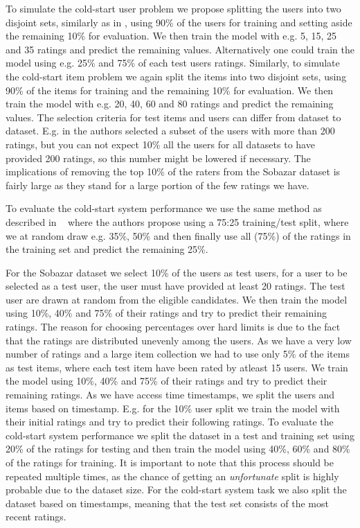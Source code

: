 To simulate the cold-start user problem we propose splitting the users into two disjoint
sets, similarly as in \cite{Stern2009, Lam2008}, using 90\% of the users for training and
setting aside the remaining 10\% for evaluation. We then train the model with e.g. 5, 15,
25 and 35 ratings and predict the remaining values. Alternatively one could train the model
using e.g. 25\% and 75\% of each test users ratings. Similarly, to simulate the cold-start
item problem we again split the items into two disjoint sets, using 90\% of the items
for training and the remaining 10\% for evaluation.  We then train the model with
e.g. 20, 40, 60 and 80 ratings and predict the remaining values. The selection criteria
for test items and users can differ from dataset to dataset. E.g. in \cite{Rashid2002, Rashid2008}
the authors selected a subset of the users with more than 200 ratings, but you can not
expect 10\% all the users for all datasets to have provided 200 ratings, so this number
might be lowered if necessary. The implications of removing the top 10\% of the
raters from the Sobazar dataset is fairly large as they stand for a large portion
of the few ratings we have.

To evaluate the cold-start system performance we use the same method as described
in ~\cite{Agarwal2009} where the authors propose using a 75:25 training/test split,
where we at random draw e.g. 35\%, 50\% and then finally use all (75\%) of the
ratings in the training set and predict the remaining 25\%.



For the Sobazar dataset we select 10\% of the users as test users, for a user to be
selected as a test user, the user must have provided at least 20 ratings. The test user are drawn
at random from the eligible candidates. We then train
the model using 10\%, 40\% and 75\% of their ratings and try to predict their remaining ratings.
The reason for choosing percentages over hard limits is due to the fact that the ratings are
distributed unevenly among the users. As we have a very low number of ratings and a large item collection we had to use
only 5\% of the items as test items, where each test item have been rated by atleast 15 users.
We train the model using 10\%, 40\% and 75\% of their ratings and try to predict their remaining
ratings. As we have access time timestamps, we split the users and items based on timestamp.
E.g. for the 10\% user split we train the model with their initial ratings and try to predict
their following ratings. To evaluate the cold-start system performance we split the dataset in a test
and training set using 20\% of the ratings for testing and then train the model
using 40\%, 60\% and 80\% of the ratings for training. It is important to note that
this process should be repeated multiple times, as the chance of getting an
\emph{unfortunate} split is highly probable due to the dataset size. For the cold-start
system task we also split the dataset based on timestamps, meaning that the test set consists
of the most recent ratings.





